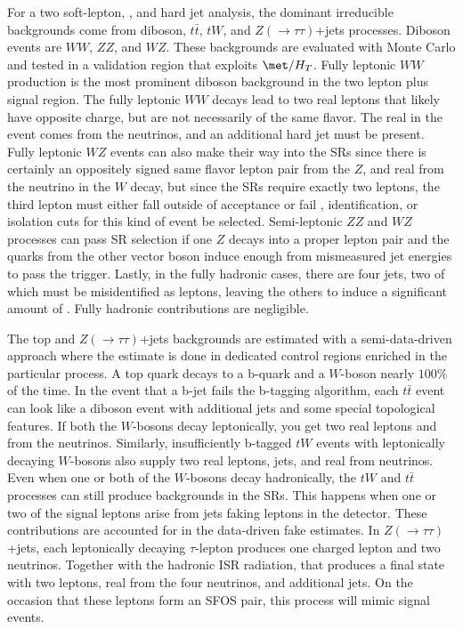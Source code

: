 For a two soft-lepton, \met{}, and hard jet analysis, the dominant irreducible backgrounds come from diboson, $t\bar{t}$, $tW$, and $Z(\rightarrow\tau\tau)$+jets processes.  Diboson events are $WW$, $ZZ$, and $WZ$.   These backgrounds are evaluated with Monte Carlo and tested in a validation region that exploits $\met/H_T$.  Fully leptonic $WW$ production is the most prominent diboson background in the two lepton plus \met signal region.  The fully leptonic $WW$ decays lead to two real leptons that likely have opposite charge, but are not necessarily of the same flavor.  The real \met in the event comes from the neutrinos, and an additional hard jet must be present.  Fully leptonic $WZ$ events can also make their way into the SRs since there is certainly an oppositely signed same flavor lepton pair from the $Z$, and real \met from the neutrino in the $W$ decay, but since the SRs require exactly two leptons, the third lepton must either fall outside of acceptance or fail \pt, identification, or isolation cuts for this kind of event be selected.  Semi-leptonic $ZZ$ and $WZ$ processes can pass SR selection if one $Z$ decays into a proper lepton pair and the quarks from the other vector boson induce enough \met from mismeasured jet energies to pass the \met trigger.  Lastly, in the fully hadronic cases, there are four jets, two of which must be misidentified as leptons, leaving the others to induce a significant amount of \met.  Fully hadronic contributions are negligible.    

The top and $Z(\rightarrow\tau\tau)$+jets backgrounds are estimated with a semi-data-driven approach where the estimate is done in dedicated control regions enriched in the particular process.  A top quark decays to a b-quark and a $W$-boson nearly $100\%$ of the time.  In the event that a b-jet fails the b-tagging algorithm, each $t\bar{t}$ event can look like a diboson event with additional jets and some special topological features.  If both the $W$-bosons decay leptonically, you get two real leptons and \met from the neutrinos.  Similarly, insufficiently b-tagged $tW$ events with leptonically decaying $W$-bosons also supply two real leptons, jets, and real \met from neutrinos.  Even when one or both of the $W$-bosons decay hadronically, the $tW$ and $t\bar{t}$ processes can still produce backgrounds in the SRs.  This happens when one or two of the signal leptons arise from jets faking leptons in the detector.  These contributions are accounted for in the data-driven fake estimates.  In $Z(\rightarrow\tau\tau)$+jets, each leptonically decaying $\tau$-lepton produces one charged lepton and two neutrinos.  Together with the hadronic ISR radiation, that produces a final state with two leptons, real \met from the four neutrinos, and additional jets.  On the occasion that these leptons form an SFOS pair, this process will mimic signal events.   

